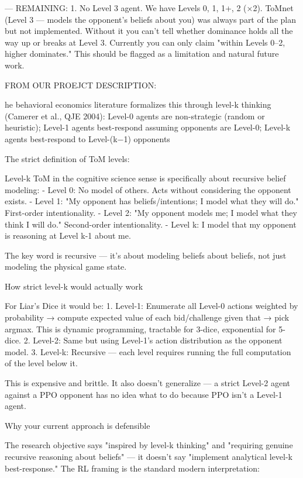\documentclass{article}
\begin{document}
  ---
REMAINING: 
  1. No Level 3 agent. We have Levels 0, 1, 1+, 2 (×2). ToMnet (Level 3 — models the opponent's beliefs about you) was always part of the plan but not implemented. Without it you can't
  tell whether dominance holds all the way up or breaks at Level 3. Currently you can only claim "within Levels 0–2, higher dominates." This should be flagged as a limitation and natural
  future work.
   

FROM OUR PROEJCT DESCRIPTION: 

he behavioral economics literature formalizes this through level-k thinking (Camerer et al.,
QJE 2004): Level-0 agents are non-strategic (random or heuristic); Level-1 agents best-respond assuming
opponents are Level-0; Level-k agents best-respond to Level-(k−1) opponents

The strict definition of ToM levels:

  Level-k ToM in the cognitive science sense is specifically about recursive belief modeling:
  - Level 0: No model of others. Acts without considering the opponent exists.
  - Level 1: "My opponent has beliefs/intentions; I model what they will do." First-order intentionality.
  - Level 2: "My opponent models me; I model what they think I will do." Second-order intentionality.
  - Level k: I model that my opponent is reasoning at Level k-1 about me.

  The key word is recursive — it's about modeling beliefs about beliefs, not just modeling the physical game state.


How strict level-k would actually work

  For Liar's Dice it would be:
  1. Level-1: Enumerate all Level-0 actions weighted by probability → compute expected value of each bid/challenge given that → pick argmax. This is dynamic programming, tractable for
  3-dice, exponential for 5-dice.
  2. Level-2: Same but using Level-1's action distribution as the opponent model.
  3. Level-k: Recursive — each level requires running the full computation of the level below it.

  This is expensive and brittle. It also doesn't generalize — a strict Level-2 agent against a PPO opponent has no idea what to do because PPO isn't a Level-1 agent.

  Why your current approach is defensible

  The research objective says "inspired by level-k thinking" and "requiring genuine recursive reasoning about beliefs" — it doesn't say "implement analytical level-k best-response." The
  RL framing is the standard modern interpretation:
\end{document}
